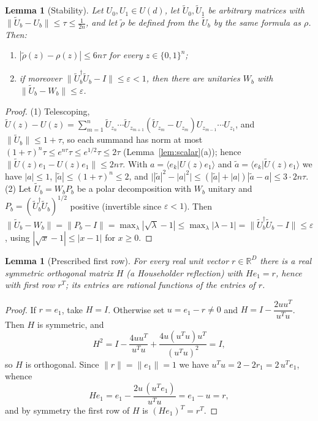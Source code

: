 \documentclass[11pt]{amsart}
\newtheorem{lemma}[theorem]{Lemma}
\theoremstyle{definition}
\theoremstyle{remark}
\newcommand{\R}{\mathbb{R}}
\begin{document}
\begin{lemma}[Stability]\label{lem:stability}
Let $U_0,U_1\in U(d)$, let $\widetilde U_0,\widetilde U_1$ be
arbitrary matrices with $\|\widetilde U_b-U_b\|\le\tau\le\frac1{2n}$,
and let $\widetilde\rho$ be defined from the $\widetilde U_b$ by the
same formula as $\rho$. Then:
\begin{enumerate}
\item $|\widetilde\rho(z)-\rho(z)|\le6n\tau$ for every
  $z\in\{0,1\}^n$;
\item if moreover $\|\widetilde U_b^\dagger\widetilde U_b-I\|
  \le\varepsilon<1$, then there are unitaries $W_b$ with
  $\|\widetilde U_b-W_b\|\le\varepsilon$.
\end{enumerate}
\end{lemma}

\begin{proof}
(1) Telescoping,
$\widetilde U(z)-U(z)=\sum_{m=1}^n
\widetilde U_{z_n}\cdots\widetilde U_{z_{m+1}}
(\widetilde U_{z_m}-U_{z_m})U_{z_{m-1}}\cdots U_{z_1}$,
and $\|\widetilde U_b\|\le1+\tau$, so each summand has norm at most
$(1+\tau)^{n}\tau\le e^{n\tau}\tau\le e^{1/2}\tau\le2\tau$
(Lemma~\ref{lem:scalar}(a)); hence
$\|\widetilde U(z)e_1-U(z)e_1\|\le2n\tau$. With
$a=\langle e_k|U(z)e_1\rangle$ and
$\tilde a=\langle e_k|\widetilde U(z)e_1\rangle$ we have $|a|\le1$,
$|\tilde a|\le(1+\tau)^n\le2$, and
$\bigl||\tilde a|^2-|a|^2\bigr|\le(|\tilde a|+|a|)|\tilde a-a|
\le3\cdot2n\tau$.
(2) Let $\widetilde U_b=W_bP_b$ be a polar decomposition with $W_b$
unitary and $P_b=(\widetilde U_b^\dagger\widetilde U_b)^{1/2}$
positive (invertible since $\varepsilon<1$). Then
$\|\widetilde U_b-W_b\|=\|P_b-I\|
=\max_\lambda|\sqrt\lambda-1|\le\max_\lambda|\lambda-1|
=\|\widetilde U_b^\dagger\widetilde U_b-I\|\le\varepsilon$,
using $|\sqrt x-1|\le|x-1|$ for $x\ge0$.
\end{proof}

\begin{lemma}[Prescribed first row]\label{lem:householder}
For every real unit vector $r\in\R^D$ there is a real symmetric
orthogonal matrix $H$ (a \emph{Householder reflection}) with
$He_1=r$, hence with first row $r^{T}$; its entries are rational
functions of the entries of $r$.
\end{lemma}

\begin{proof}
If $r=e_1$, take $H=I$. Otherwise set $u=e_1-r\ne0$ and
$H=I-\dfrac{2uu^{T}}{u^{T}u}$. Then $H$ is symmetric, and
\[
  H^2=I-\frac{4uu^{T}}{u^{T}u}+\frac{4u(u^{T}u)u^{T}}{(u^{T}u)^2}=I,
\]
so $H$ is orthogonal. Since $\|r\|=\|e_1\|=1$ we have
$u^{T}u=2-2r_1=2\,u^{T}e_1$, whence
\[
  He_1=e_1-\frac{2u\,(u^{T}e_1)}{u^{T}u}=e_1-u=r ,
\]
and by symmetry the first row of $H$ is $(He_1)^{T}=r^{T}$.
\end{proof}
\end{document}
